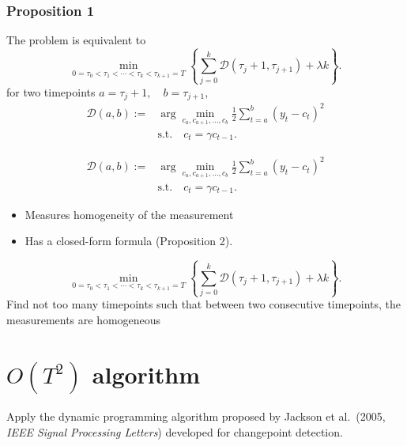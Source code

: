 \documentclass[20pt]{beamer}
\theoremstyle{definition}
\begin{document}
\begin{frame}
	\frametitle{Proposition 1}
	\small
The problem is equivalent to
\begin{equation*}
	\min_{0 = \tau_0 < \tau_1 < \cdots < \tau_k < \tau_{k+1} = T} 
	\left\{ \sum_{j=0}^k \mathcal{D}(\tau_j+1, \tau_{j+1}) + \lambda k \right\}.
\end{equation*}
for two timepoints $a = \tau_j + 1, \quad b = \tau_{j+1}$,
\begin{align*}
\mathcal{D}(a,b) := &\arg\min_{c_a, c_{a+1}, \ldots, c_b} \frac{1}{2} \sum_{t=a}^b (y_t - c_t)^2\\& \text{s.t.} \quad c_t = \gamma c_{t-1}.
\end{align*}

	\end{frame}
\begin{frame}
\begin{align*}
	\mathcal{D}(a,b) := &\arg\min_{c_a, c_{a+1}, \ldots, c_b} \frac{1}{2} \sum_{t=a}^b (y_t - c_t)^2\\& \text{s.t.} \quad c_t = \gamma c_{t-1}.
\end{align*}
\begin{itemize}
	\item Measures homogeneity of the measurement
	\item Has a closed-form formula (Proposition 2).
\end{itemize}
%
\end{frame}
%
\begin{frame}
	\small
	\begin{equation*}
		\min_{0 = \tau_0 < \tau_1 < \cdots < \tau_k < \tau_{k+1} = T} 
		\left\{ \sum_{j=0}^k \mathcal{D}(\tau_j+1, \tau_{j+1}) + \lambda k \right\}.
	\end{equation*}
Find not too many timepoints such that  
between two consecutive timepoints, the measurements are homogeneous
\end{frame}

\section{$O(T^2)$ algorithm}
\begin{frame}
Apply the dynamic programming algorithm proposed by Jackson et al.\ (2005, \textit{IEEE Signal Processing Letters}) developed for changepoint detection.

\end{frame}
\end{document}
